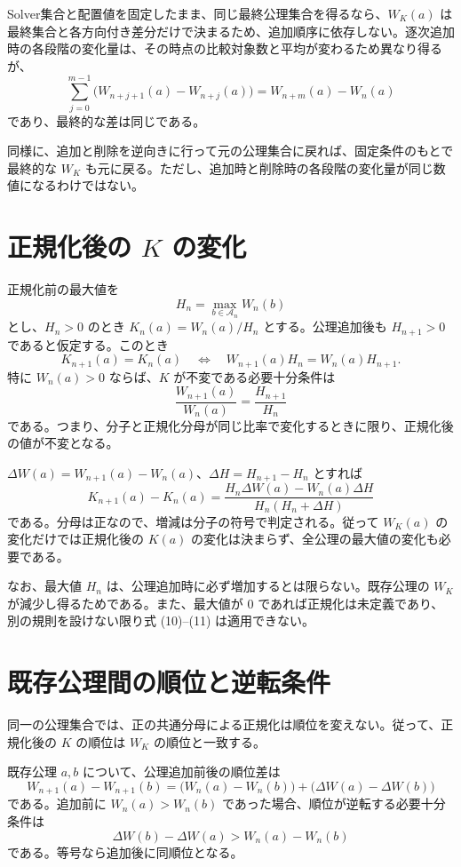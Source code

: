 \documentclass[a4paper,11pt]{ltjsarticle}
\begin{document}
Solver集合と配置値を固定したまま、同じ最終公理集合を得るなら、$W_K(a)$ は最終集合と各方向付き差分だけで決まるため、追加順序に依存しない。逐次追加時の各段階の変化量は、その時点の比較対象数と平均が変わるため異なり得るが、
\[
\sum_{j=0}^{m-1}\bigl(W_{n+j+1}(a)-W_{n+j}(a)\bigr)
=W_{n+m}(a)-W_n(a)
\]
であり、最終的な差は同じである。

同様に、追加と削除を逆向きに行って元の公理集合に戻れば、固定条件のもとで最終的な $W_K$ も元に戻る。ただし、追加時と削除時の各段階の変化量が同じ数値になるわけではない。

\section{正規化後の $K$ の変化}

正規化前の最大値を
\[
H_n=\max_{b\in\mathcal A_n}W_n(b)
\]
とし、$H_n>0$ のとき $K_n(a)=W_n(a)/H_n$ とする。公理追加後も $H_{n+1}>0$ であると仮定する。このとき
\[
K_{n+1}(a)=K_n(a)
\quad\Longleftrightarrow\quad
W_{n+1}(a)H_n=W_n(a)H_{n+1}.
\tag{10}
\]
特に $W_n(a)>0$ ならば、$K$ が不変である必要十分条件は
\[
\frac{W_{n+1}(a)}{W_n(a)}=\frac{H_{n+1}}{H_n}
\]
である。つまり、分子と正規化分母が同じ比率で変化するときに限り、正規化後の値が不変となる。

$\Delta W(a)=W_{n+1}(a)-W_n(a)$、$\Delta H=H_{n+1}-H_n$ とすれば
\[
\boxed{
K_{n+1}(a)-K_n(a)
=\frac{H_n\Delta W(a)-W_n(a)\Delta H}
{H_n(H_n+\Delta H)}
}
\tag{11}
\]
である。分母は正なので、増減は分子の符号で判定される。従って $W_K(a)$ の変化だけでは正規化後の $K(a)$ の変化は決まらず、全公理の最大値の変化も必要である。

なお、最大値 $H_n$ は、公理追加時に必ず増加するとは限らない。既存公理の $W_K$ が減少し得るためである。また、最大値が $0$ であれば正規化は未定義であり、別の規則を設けない限り式 (10)--(11) は適用できない。

\section{既存公理間の順位と逆転条件}

同一の公理集合では、正の共通分母による正規化は順位を変えない。従って、正規化後の $K$ の順位は $W_K$ の順位と一致する。

既存公理 $a,b$ について、公理追加前後の順位差は
\[
W_{n+1}(a)-W_{n+1}(b)
=\bigl(W_n(a)-W_n(b)\bigr)
+\bigl(\Delta W(a)-\Delta W(b)\bigr)
\tag{12}
\]
である。追加前に $W_n(a)>W_n(b)$ であった場合、順位が逆転する必要十分条件は
\[
\boxed{\Delta W(b)-\Delta W(a)>W_n(a)-W_n(b)}
\tag{13}
\]
である。等号なら追加後に同順位となる。
\end{document}

